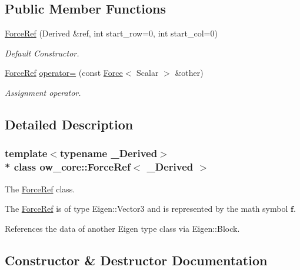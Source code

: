 \subsection*{Public Member Functions}
\begin{DoxyCompactItemize}
\item 
\hyperlink{classow__core_1_1ForceRef_ac2f9743b3d3cfa13862d46a9572e9b02}{Force\+Ref} (Derived \&ref, int start\+\_\+row=0, int start\+\_\+col=0)
\begin{DoxyCompactList}\small\item\em Default Constructor. \end{DoxyCompactList}\item 
\hyperlink{classow__core_1_1ForceRef}{Force\+Ref} \hyperlink{classow__core_1_1ForceRef_af08542f4316a0411199e724e27e441f9}{operator=} (const \hyperlink{classow__core_1_1Force}{Force}$<$ Scalar $>$ \&other)\hypertarget{classow__core_1_1ForceRef_af08542f4316a0411199e724e27e441f9}{}\label{classow__core_1_1ForceRef_af08542f4316a0411199e724e27e441f9}

\begin{DoxyCompactList}\small\item\em Assignment operator. \end{DoxyCompactList}\end{DoxyCompactItemize}


\subsection{Detailed Description}
\subsubsection*{template$<$typename \+\_\+\+Derived$>$\\*
class ow\+\_\+core\+::\+Force\+Ref$<$ \+\_\+\+Derived $>$}

The \hyperlink{classow__core_1_1ForceRef}{Force\+Ref} class. 

The \hyperlink{classow__core_1_1ForceRef}{Force\+Ref} is of type Eigen\+::\+Vector3 and is represented by the math symbol $\mathbf{f}$.

References the data of another Eigen type class via Eigen\+::\+Block. 

\subsection{Constructor \& Destructor Documentation}
